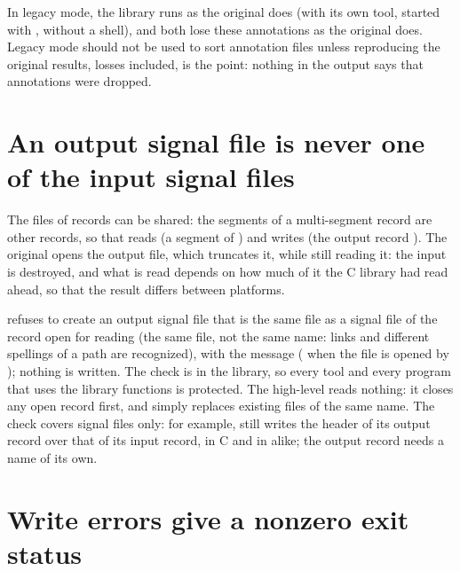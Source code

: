 \begin{note}
In legacy mode, the library runs  as the original does (with
its own  tool, started with , without a shell),
and both lose these annotations as the original does. Legacy mode should not
be used to sort annotation files unless reproducing the original results,
losses included, is the point: nothing in the output says that annotations
were dropped.
\end{note}

\section{An output signal file is never one of the input signal files}
\label{sec:output-input}

The files of records can be shared: the segments of a multi-segment record
are other records, so that  reads
 (a segment of ) and writes 
(the output record ). The original opens the output file, which
truncates it, while still reading it: the input is destroyed, and what is
read depends on how much of it the C library had read ahead, so that the
result differs between platforms.

\wfdbx{} refuses to create an output signal file that is the same file as a
signal file of the record open for reading (the same file, not the same
name: links and different spellings of a path are recognized), with the
message 
( when the file is opened by ); nothing is
written. The check is in the library, so every tool and every program that
uses the library functions is protected. The high-level 
reads nothing: it closes any open record first, and simply replaces
existing files of the same name. The check covers signal files only: for
example,  still writes the header of its output
record over that of its input record, in C and in \wfdbx{} alike; the output
record needs a name of its own.

\section{Write errors give a nonzero exit status}
\label{sec:write-errors}

